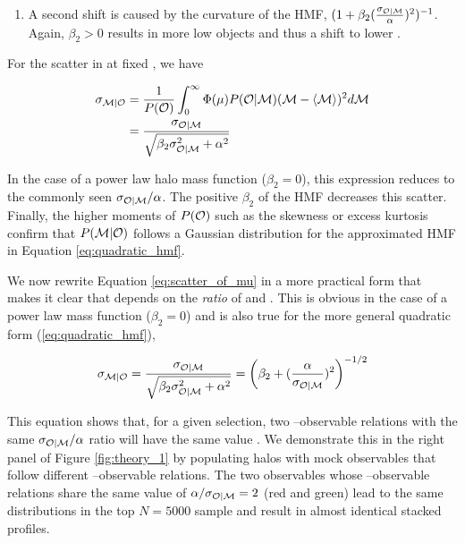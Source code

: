 \documentclass[fleqn,usenatbib,useAMS]{mnras}
\begin{document}
\begin{CJK*}{UTF8}{gbsn}
\begin{enumerate}
        \item A second shift is caused by the curvature of the HMF, $(1
            + \beta_2 (\frac{\sigma_{\mathcal{O} | \mathcal{M}}}{\alpha})^2)^{-1}$. 
            Again, $\beta_2 > 0$ results in more low \haloSym{} objects and thus a shift to lower 
            \haloSym{}.

    \end{enumerate}

    For the scatter in \haloSym{} at fixed \obsSym{}, we have

    \begin{equation}
    \begin{aligned}
        \sigma_{\mathcal{M} | \mathcal{O}}{}
        &= \frac{1}{P({\mathcal{O}}{})}
            \int_{0}^{\infty} \Phi(\mu){} P({\mathcal{O}}{} | {\mathcal{M}}{}) ( {\mathcal{M}}{}  - \langle {\mathcal{M}}{}
            \rangle )^2 d{\mathcal{M}}{} \\
    	&= \frac{\sigma_{\mathcal{O} | \mathcal{M}}}{\sqrt{\beta_2 \sigma_{\mathcal{O} | \mathcal{M}}^2 + \alpha^2}}
        \label{eq:scatter_of_mu}
    \end{aligned}
    \end{equation}

    \noindent In the case of a power law halo mass function ($\beta_2 = 0$), this expression reduces
    to the commonly seen $\sigma_{\mathcal{O} | \mathcal{M}} / \alpha$. 
    The positive $\beta_2$ of the HMF decreases this scatter. 
    Finally, the higher moments of $P({\mathcal{O}}{})$ such as the skewness or excess kurtosis confirm
    that $P({\mathcal{M}}{} | {\mathcal{O}}{})$ follows a Gaussian distribution for the approximated HMF in
    Equation \ref{eq:quadratic_hmf}.

    We now rewrite Equation \ref{eq:scatter_of_mu} in a more practical form that makes it clear
    that \scatterMhaloObsSym{} depends on the {\em ratio} of \scatterObsSymMhalo{} and \slope.
    This is obvious in the case of a power law mass function ($\beta_2 = 0$) and is also true
    for the more general quadratic form (\ref{eq:quadratic_hmf}),

    \begin{equation}
        \sigma_{\mathcal{M} | \mathcal{O}}{}
        = \frac{\sigma_{\mathcal{O} | \mathcal{M}}}{\sqrt{\beta_2 \sigma_{\mathcal{O} | \mathcal{M}}^2 + \alpha^2}}
        = \left(\beta_2 + (\frac{\alpha}{\sigma_{\mathcal{O} | \mathcal{M}}})^2\right)^{-1/2}
        \label{eq:ratio_is_what_matters}
    \end{equation}

    This equation shows that, for a given \topn{} selection, two \mvir{}--observable relations with
    the same $\sigma_{\mathcal{O} | \mathcal{M}} / \alpha$ ratio will have the same value \scatterMhaloObsSym{}. 
    We demonstrate this in the right panel of Figure \ref{fig:theory_1} by populating  halos
    with mock observables that follow different \mvir{}--observable relations.
    The two observables whose \mvir{}--observable relations share the same value of $ \alpha /
    \sigma_{\mathcal{O} | \mathcal{M}} = 2$ (red and green) lead to the same \mvir{} distributions in the top
    $N=5000$ sample and result in almost identical stacked \dsigma{} profiles.


\end{CJK*}
\end{document}
